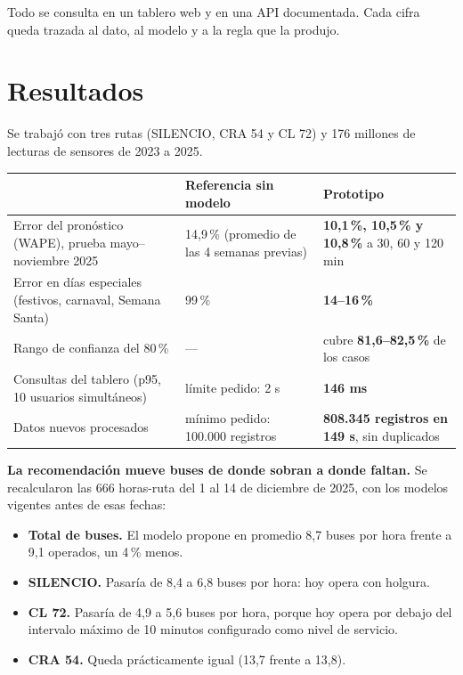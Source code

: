 \documentclass[11pt,a4paper]{article}
\begin{document}
Todo se consulta en un tablero web y en una API documentada. Cada cifra queda trazada al dato, al modelo y a la regla que la produjo.

\section*{Resultados}

Se trabajó con tres rutas (SILENCIO, CRA 54 y CL 72) y 176 millones de lecturas de sensores de 2023 a 2025.

\begin{table}[h]
\centering\small
\begin{tabularx}{\textwidth}{lYY}
\toprule
 & \textbf{Referencia sin modelo} & \textbf{Prototipo} \\
\midrule
Error del pronóstico (WAPE), prueba mayo--noviembre 2025 & 14,9\,\% (promedio de las 4 semanas previas) & \textbf{10,1\,\%, 10,5\,\% y 10,8\,\%} a 30, 60 y 120 min \\
Error en días especiales (festivos, carnaval, Semana Santa) & 99\,\% & \textbf{14--16\,\%} \\
Rango de confianza del 80\,\% & --- & cubre \textbf{81,6--82,5\,\%} de los casos \\
Consultas del tablero (p95, 10 usuarios simultáneos) & límite pedido: 2 s & \textbf{146 ms} \\
Datos nuevos procesados & mínimo pedido: 100.000 registros & \textbf{808.345 registros en 149 s}, sin duplicados \\
\bottomrule
\end{tabularx}
\end{table}

\textbf{La recomendación mueve buses de donde sobran a donde faltan.} Se recalcularon las 666 horas-ruta del 1 al 14 de diciembre de 2025, con los modelos vigentes antes de esas fechas:

\begin{itemize}
  \setlength{\itemsep}{0.1em}
  \item \textbf{Total de buses.} El modelo propone en promedio 8,7 buses por hora frente a 9,1 operados, un 4\,\% menos.
  \item \textbf{SILENCIO.} Pasaría de 8,4 a 6,8 buses por hora: hoy opera con holgura.
  \item \textbf{CL 72.} Pasaría de 4,9 a 5,6 buses por hora, porque hoy opera por debajo del intervalo máximo de 10 minutos configurado como nivel de servicio.
  \item \textbf{CRA 54.} Queda prácticamente igual (13,7 frente a 13,8).
\end{itemize}
\end{document}
